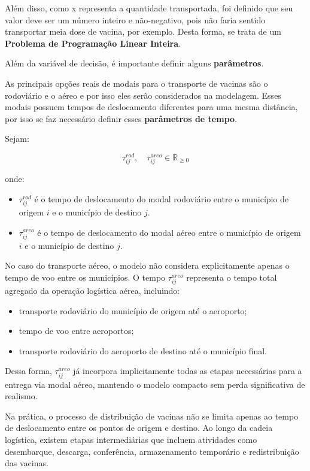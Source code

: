 Além disso, como x representa a quantidade transportada, foi definido que seu valor deve ser um número inteiro e não-negativo, pois não faria sentido transportar meia dose de vacina, por exemplo. Desta forma, se trata de um \textbf{Problema de Programação Linear Inteira}.

Além da variável de decisão, é importante definir alguns \textbf{parâmetros}.

As principais opções reais de modais para o transporte de vacinas são o rodoviário e o aéreo e por isso eles serão considerados na modelagem. Esses modais possuem tempos de deslocamento diferentes para uma mesma distância, por isso se faz necessário definir esses \textbf{parâmetros de tempo}.

Sejam:

\[
\tau_{ij}^{rod}, \quad \tau_{ij}^{areo} \in \mathbb{R}_{\geq 0}
\]

onde:
\begin{itemize}
    \item $\tau_{ij}^{rod}$ é o tempo de deslocamento do modal rodoviário entre o município de origem $i$ e o município de destino $j$.
    \item $\tau_{ij}^{areo}$ é o tempo de deslocamento do modal aéreo entre o município de origem $i$ e o município de destino $j$.
\end{itemize}

No caso do transporte aéreo, o modelo não considera explicitamente apenas o tempo de voo entre os municípios. O tempo $\tau_{ij}^{areo}$ representa o tempo total agregado da operação logística aérea, incluindo:

\begin{itemize}
    \item transporte rodoviário do município de origem até o aeroporto;
    \item tempo de voo entre aeroportos;
    \item transporte rodoviário do aeroporto de destino até o município final.
\end{itemize}

Dessa forma, $\tau_{ij}^{areo}$ já incorpora implicitamente todas as etapas necessárias para a entrega via modal aéreo, mantendo o modelo compacto sem perda significativa de realismo.

Na prática, o processo de distribuição de vacinas não se limita apenas ao tempo de deslocamento entre os pontos de origem e destino. Ao longo da cadeia logística, existem etapas intermediárias que incluem atividades como desembarque, descarga, conferência, armazenamento temporário e redistribuição das vacinas.

